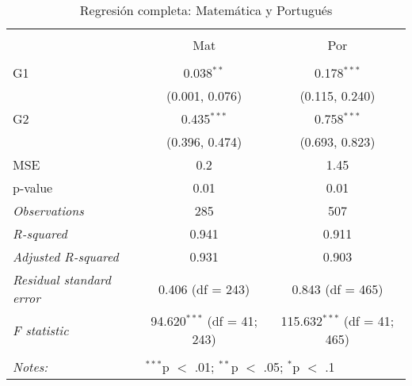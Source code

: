 
\begin{table}[!htbp] \centering 
  \caption{Regresión completa: Matemática y Portugués} 
  \label{} 
\begin{tabular}{@{\extracolsep{5pt}}lcc} 
\\[-1.8ex]\hline \\[-1.8ex] 
 & Mat & Por \\ 
\hline \\[-1.8ex] 
 G1 & 0.038$^{**}$ & 0.178$^{***}$ \\ 
  & (0.001, 0.076) & (0.115, 0.240) \\ 
  G2 & 0.435$^{***}$ & 0.758$^{***}$ \\ 
  & (0.396, 0.474) & (0.693, 0.823) \\ 
 MSE & 0.2 & 1.45 \\ 
p-value & 0.01 & 0.01 \\ 
\textit{Observations} & 285 & 507 \\ 
\textit{R-squared} & 0.941 & 0.911 \\ 
\textit{Adjusted R-squared} & 0.931 & 0.903 \\ 
\textit{Residual standard error} & 0.406 (df = 243) & 0.843 (df = 465) \\ 
\textit{F statistic} & 94.620$^{***}$ (df = 41; 243) & 115.632$^{***}$ (df = 41; 465) \\ 
\hline \\[-1.8ex] 
\textit{Notes:} & \multicolumn{2}{l}{$^{***}$p $<$ .01; $^{**}$p $<$ .05; $^{*}$p $<$ .1} \\ 
\end{tabular} 
\end{table} 
